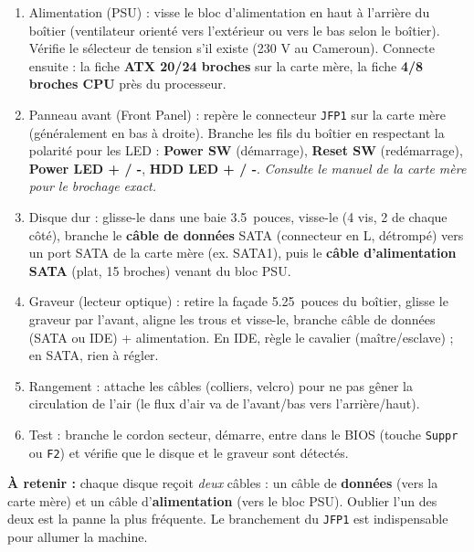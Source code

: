 \documentclass[11pt]{article}
\newcommand{\cle}[1]{{\popxbold\color{popdark}#1}}
\begin{document}
\begin{methode}
\begin{enumerate}
\item \cle{Alimentation (PSU)} : visse le bloc d'alimentation en haut à l'arrière du boîtier (ventilateur orienté vers l'extérieur ou vers le bas selon le boîtier). Vérifie le sélecteur de tension s'il existe (230 V au Cameroun). Connecte ensuite : la fiche \textbf{ATX 20/24 broches} sur la carte mère, la fiche \textbf{4/8 broches CPU} près du processeur.
\item \cle{Panneau avant (Front Panel)} : repère le connecteur \texttt{JFP1} sur la carte mère (généralement en bas à droite). Branche les fils du boîtier en respectant la polarité pour les LED : \textbf{Power SW} (démarrage), \textbf{Reset SW} (redémarrage), \textbf{Power LED + / -}, \textbf{HDD LED + / -}. \emph{Consulte le manuel de la carte mère pour le brochage exact.}
\item \cle{Disque dur} : glisse-le dans une baie \SI{3,5}{pouces}, visse-le (4 vis, 2 de chaque côté), branche le \textbf{câble de données} SATA (connecteur en L, détrompé) vers un port SATA de la carte mère (ex. SATA1), puis le \textbf{câble d'alimentation SATA} (plat, 15 broches) venant du bloc PSU.
\item \cle{Graveur (lecteur optique)} : retire la façade \SI{5,25}{pouces} du boîtier, glisse le graveur par l'avant, aligne les trous et visse-le, branche câble de données (SATA ou IDE) + alimentation. En IDE, règle le cavalier (maître/esclave) ; en SATA, rien à régler.
\item \cle{Rangement} : attache les câbles (colliers, velcro) pour ne pas gêner la circulation de l'air (le flux d'air va de l'avant/bas vers l'arrière/haut).
\item \cle{Test} : branche le cordon secteur, démarre, entre dans le BIOS (touche \texttt{Suppr} ou \texttt{F2}) et vérifie que le disque et le graveur sont détectés.
\end{enumerate}
\textbf{À retenir :} chaque disque reçoit \emph{deux} câbles : un câble de \textbf{données} (vers la carte mère) et un câble d'\textbf{alimentation} (vers le bloc PSU). Oublier l'un des deux est la panne la plus fréquente. Le branchement du \texttt{JFP1} est indispensable pour allumer la machine.
\end{methode}
\end{document}

